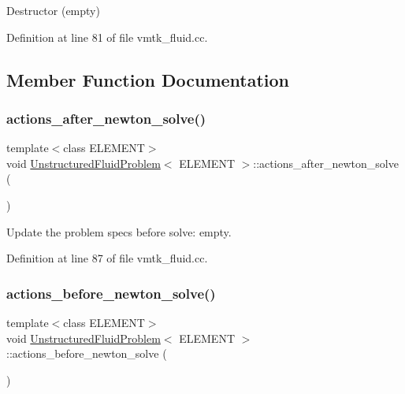 Destructor (empty) 



Definition at line 81 of file vmtk\+\_\+fluid.\+cc.



\subsection{Member Function Documentation}
\mbox{\label{classUnstructuredFluidProblem_af6811af7c3d4241254278ec246733d93}} 
\subsubsection{\texorpdfstring{actions\+\_\+after\+\_\+newton\+\_\+solve()}{actions\_after\_newton\_solve()}}
{\footnotesize\ttfamily template$<$class E\+L\+E\+M\+E\+NT$>$ \\
void \hyperlink{classUnstructuredFluidProblem}{Unstructured\+Fluid\+Problem}$<$ E\+L\+E\+M\+E\+NT $>$\+::actions\+\_\+after\+\_\+newton\+\_\+solve (\begin{DoxyParamCaption}{ }\end{DoxyParamCaption})\hspace{0.3cm}{\ttfamily [inline]}}



Update the problem specs before solve\+: empty. 



Definition at line 87 of file vmtk\+\_\+fluid.\+cc.

\mbox{\label{classUnstructuredFluidProblem_a3d93e13193cd466fa0901a470e281765}} 
\subsubsection{\texorpdfstring{actions\+\_\+before\+\_\+newton\+\_\+solve()}{actions\_before\_newton\_solve()}}
{\footnotesize\ttfamily template$<$class E\+L\+E\+M\+E\+NT$>$ \\
void \hyperlink{classUnstructuredFluidProblem}{Unstructured\+Fluid\+Problem}$<$ E\+L\+E\+M\+E\+NT $>$\+::actions\+\_\+before\+\_\+newton\+\_\+solve (\begin{DoxyParamCaption}{ }\end{DoxyParamCaption})\hspace{0.3cm}{\ttfamily [inline]}}



